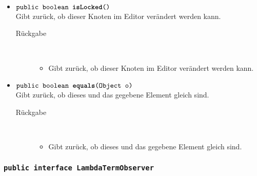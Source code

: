 \begin{description}
\begin{itemize}
		\item $\texttt{public boolean \textbf{isLocked}()}$ \\ Gibt zurück, ob dieser Knoten im Editor verändert werden kann.
		\begin{description}
			\item[Rückgabe] \hfill \\
			\vspace{-.8cm}
			\begin{itemize}
				\item Gibt zurück, ob dieser Knoten im Editor verändert werden kann.
			\end{itemize}
		\end{description}
		
		\item $\texttt{public boolean \textbf{equals}(Object o)}$ \\ Gibt zurück, ob dieses und das gegebene Element gleich sind.
		\begin{description}
			\item[Rückgabe] \hfill \\
			\vspace{-.8cm}
			\begin{itemize}
				\item Gibt zurück, ob dieses und das gegebene Element gleich sind.
			\end{itemize}
		\end{description}
	\end{itemize}
\end{description}

\subsubsection{\normalfont \texttt{public interface \textbf{LambdaTermObserver}}}

